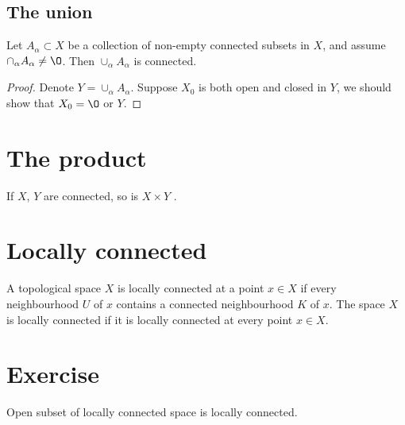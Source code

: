 \subsection{The union}

\begin{proposition}{}{}
    Let $A_{\alpha}\subset X$ be a collection of non-empty connected subsets in $X$, 
    and assume $\cap_{\alpha}A_{\alpha}\neq \O$. Then $\cup_{\alpha}A_{\alpha}$ is connected. 
\end{proposition}
\begin{proof}
    Denote $Y=\cup_{\alpha}A_{\alpha}$. 
    Suppose $X_0$ is both open and closed in $Y$, we should show that $X_0=\O$ or $Y$.
    
\end{proof}

\section{The product}
\begin{proposition}{}{}
    If $X$, $Y$ are connected, so is $X \times Y$ .
\end{proposition}


\section{Locally connected}

\begin{definition}{}{}
    A topological space $X$ is locally connected at a point $x\in X$ if every neighbourhood $U$ of $x$ contains a connected neighbourhood $K$ of $x$.
    The space $X$ is locally connected if it is locally connected at every point $x\in X$.
\end{definition}


\section{Exercise}

\begin{exercise}{}{}
    Open subset of locally connected space is locally connected.
\end{exercise}

